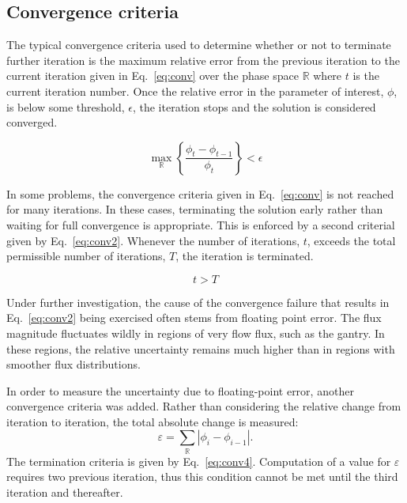 \subsection{Convergence criteria}
The typical convergence criteria used to determine whether or not to terminate further iteration is the maximum relative error from the previous iteration to the current iteration given in Eq.~\ref{eq:conv} over the phase space $\mathbb{R}$ where $t$ is the current iteration number. Once the relative error in the parameter of interest, $\phi$, is below some threshold, $\epsilon$, the iteration stops and the solution is considered converged.

\begin{equation}\label{eq:conv}
\max_{\mathbb{R}} \left\{ \frac{\phi_t - \phi_{t-1}}{\phi_t} \right\} < \epsilon
\end{equation}

In some problems, the convergence criteria given in Eq.~\ref{eq:conv} is not reached for many iterations. In these cases, terminating the solution early rather than waiting for full convergence is appropriate. This is enforced by a second criterial given by Eq.~\ref{eq:conv2}. Whenever the number of iterations, $t$, exceeds the total permissible number of iterations, $T$, the iteration is terminated.

\begin{equation}\label{eq:conv2}
t > T
\end{equation}

Under further investigation, the cause of the convergence failure that results in Eq.~\ref{eq:conv2} being exercised often stems from floating point error. The flux magnitude fluctuates wildly in regions of very flow flux, such as the gantry. In these regions, the relative uncertainty remains much higher than in regions with smoother flux distributions. 


In order to measure the uncertainty due to floating-point error, another convergence criteria was added. Rather than considering the relative change from iteration to iteration, the total absolute change is measured:
\begin{equation}\label{eq:conv3}
\varepsilon = \sum_{\mathbb{R}} |\phi_i - \phi_{i-1}|.
\end{equation}
The termination criteria is given by Eq.~\ref{eq:conv4}. Computation of a value for $\varepsilon$ requires two previous iteration, thus this condition cannot be met until the third iteration and thereafter.

